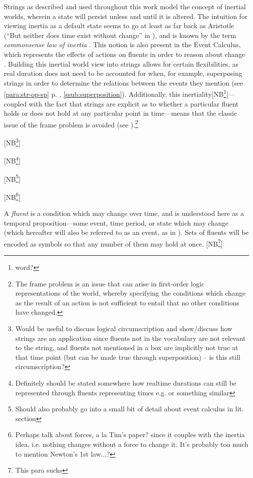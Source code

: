 \documentclass[a4paper,12pt,leqno]{article}
\newcommand{\vph}[1]{\vphantom{#1}}
\newcommand{\ebox}[1]{\fbox{$\vph{'(),}#1$}}
\newcommand{\EventString}[1]{
	\renewcommand*{\do}[1]{\ebox{##1}}%
	\PipeParser{#1}
}
\newcommand{\selfnote}[1]{{\color{red}[NB\footnote{{\color{red}#1}}]}}
\newcommand{\nb}{\selfnote}
\begin{document}
Strings as described and used throughout this work model the concept of inertial worlds, wherein a state will persist unless and until it is altered. The intuition for viewing inertia as a default state seems to go at least as far back as Aristotle (``But neither does time exist without change'' in \textit{}), and is known by the term \textit{commonsense law of inertia} \citep[p. 19]{shanahan1997solving}. This notion is also present in the Event Calculus, which represents the effects of actions on fluents in order to reason about change \citep{Kowalski1986,Miller1999,Mueller2008}. Building this inertial world view into strings allows for certain flexibilities, as real duration does not need to be accounted for when, for example, superposing strings in order to determine the relations between the events they mention (see \cref{para:str-op-sp} p. \pageref{para:str-op-sp}, \cref{ssub:superposition}). Additionally, this inertiality\nb{word?}---coupled with the fact that strings are explicit as to whether a particular fluent holds or does not hold at any particular point in time---means that the classic issue of the frame problem is avoided (see \citet[pp. 30-31]{Mccarthy69somephilosophical}).\footnote{The frame problem is an issue that can arise in first-order logic representations of the world, whereby specifying the conditions which change as the result of an action is not sufficient to entail that no other conditions have changed.}

\nb{Would be useful to discuss logical circumscription and show/discuss how strings are an application since fluents not in the vocabulary are not relevant to the string, and fluents not mentioned in a box are implicitly not true at that time point (but can be made true through superposition) -- is this still circumscription?}

\nb{Definitely should be stated somewhere how realtime durations can still be represented through fluents representing times e.g. \EventString{|sleep\mhyphen{}in,friday|friday|} or something similar}

\nb{Should also probably go into a small bit of detail about event calculus in lit. section}

\nb{Perhaps talk about forces, a la Tim's paper? since it couples with the inertia idea, i.e. nothing changes without a force to change it. It's probably too much to mention Newton's 1st law...?}

A \textit{fluent} is a condition which may change over time, and is understood here as a temporal proposition---some event, time period, or state which may change (which hereafter will also be referred to as an event, as in \citet{Pustejovsky2005}). Sets of fluents will be encoded as symbols so that any number of them may hold at once. \nb{This para sucks}
\end{document}
